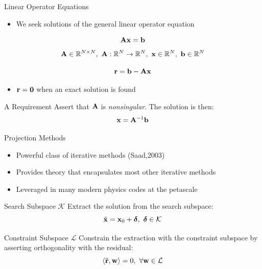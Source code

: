 \documentclass{beamer}
\begin{document}
\begin{frame}{Linear Operator Equations}

  \begin{itemize}
  \item We seek solutions of the general linear operator equation
  \end{itemize}

  \[
  \mathbf{A} \mathbf{x} = \mathbf{b}
  \]
  \[
  \mathbf{A} \in \mathbb{R}^{N \times N},\ \mathbf{A} : \mathbb{R}^{N}
  \rightarrow \mathbb{R}^{N},\ \mathbf{x} \in \mathbb{R}^N,\ \mathbf{b} \in
  \mathbb{R}^N
  \]


  \[
  \mathbf{r} = \mathbf{b} - \mathbf{A}\mathbf{x}
  \]

  \begin{itemize}
  \item $\mathbf{r}=\mathbf{0}$ when an exact solution is found
  \end{itemize}

  \pause
  \begin{beamerboxesrounded}[upper=boxheadcolor,lower=boxbodycolor,shadow=true]
    {A Requirement} Assert that $\mathbf{A}$ is \textit{nonsingular}. The
    solution is then:
    \[
    \mathbf{x} = \mathbf{A}^{-1}\mathbf{b}
    \]
  \end{beamerboxesrounded}

\end{frame}

\begin{frame}{Projection Methods}

  \begin{itemize}
  \item Powerful class of iterative methods (Saad,2003)
  \item Provides theory that encapsulates most other iterative methods
  \item Leveraged in many modern physics codes at the petascale
  \end{itemize}

  \pause
  \begin{beamerboxesrounded}[upper=boxheadcolor,lower=boxbodycolor,shadow=true]
    {Search Subspace $\mathcal{K}$} Extract the solution from the
    search subspace:
    \[
    \tilde{\mathbf{x}} = \mathbf{x}_0 +
    \boldsymbol{\delta},\ \boldsymbol{\delta} \in \mathcal{K}
    \]
  \end{beamerboxesrounded}

  \pause
  \begin{beamerboxesrounded}[upper=boxheadcolor,lower=boxbodycolor,shadow=true]
    {Constraint Subspace $\mathcal{L}$} Constrain the extraction with
    the constraint subspace by asserting orthogonality with the
    residual:
    \[
    \langle \tilde{\mathbf{r}},\mathbf{w} \rangle = 0,\ \forall \mathbf{w} \in
    \mathcal{L}
    \]  
  \end{beamerboxesrounded}

\end{frame}
\end{document}
